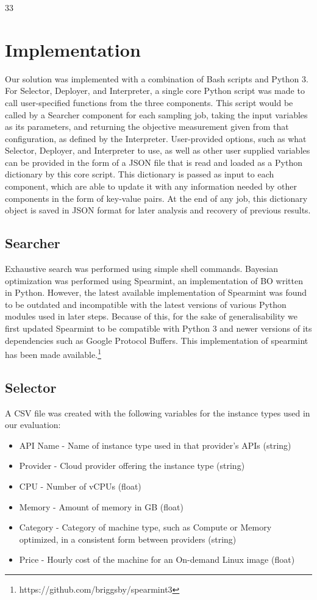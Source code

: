 33\documentclass{article}
\begin{document}
\section{Implementation}
Our solution was implemented with a combination of Bash scripts and Python 3. For Selector, Deployer, and Interpreter, a single core Python script was made to call user-specified functions from the three components. This script would be called by a Searcher component for each sampling job, taking the input variables as its parameters, and returning the objective measurement given from that configuration, as defined by the Interpreter. User-provided options, such as what Selector, Deployer, and Interpreter to use, as well as other user supplied variables can be provided in the form of a JSON file that is read and loaded as a Python dictionary by this core script. This dictionary is passed as input to each component, which are able to update it with any information needed by other components in the form of key-value pairs. At the end of any job, this dictionary object is saved in JSON format for later analysis and recovery of previous results.

\subsection{Searcher}
Exhaustive search was performed using simple shell commands. Bayesian optimization was performed using Spearmint, an implementation of BO written in Python. However, the latest available implementation of Spearmint was found to be outdated and incompatible with the latest versions of various Python modules used in later steps. 
Because of this, for the sake of generalisability we first updated Spearmint to be compatible with Python 3 and newer versions of its dependencies such as Google Protocol Buffers. This implementation of spearmint has been made available.\footnote{https://github.com/briggsby/spearmint3}

\subsection{Selector}
A CSV file was created with the following variables for the instance types used in our evaluation:

\begin{itemize}
\item API Name - Name of instance type used in that provider's APIs (string)
\item Provider - Cloud provider offering the instance type (string)
\item CPU - Number of vCPUs (float)
\item Memory - Amount of memory in GB (float)
\item Category - Category of machine type, such as Compute or Memory optimized, in a consistent form between providers (string) 	
\item Price - Hourly cost of the machine for an On-demand Linux image (float)
\end{itemize}
\end{document}
